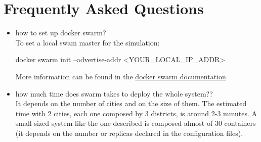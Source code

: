 \section{Frequently Asked Questions}

\begin{itemize}

\item how to set up docker swarm?
\\
To set a local swam master for the simulation:

docker swarm init --advertise-addr <YOUR_LOCAL_IP_ADDR>

More information can be found in the \href{https://docs.docker.com/engine/swarm/swarm-tutorial/create-swarm/}{docker swarm documentation}

\item how much time does swarm takes to deploy the whole system??
\\

It depends on the number of cities and on the size of them.
The estimated time with 2 cities, each one
composed by 3 districts, is around 2-3 minutes.
A small sized system like
the one described is composed almost of 30 containers
(it depends on the number or replicas declared in the configuration files).

\end{itemize}
